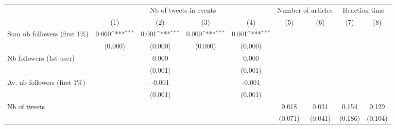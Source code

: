 {
\def\sym#1{\ifmmode^{#1}\else\(^{#1}\)\fi}
\begin{tabular}{l*{8}{c}}
\hline\hline
                    &\multicolumn{4}{c}{Nb of tweets in events}                                             &\multicolumn{2}{c}{Number of articles}     &\multicolumn{2}{c}{Reaction time}          \\\cmidrule(lr){2-5}\cmidrule(lr){6-7}\cmidrule(lr){8-9}
                    &\multicolumn{1}{c}{(1)}         &\multicolumn{1}{c}{(2)}         &\multicolumn{1}{c}{(3)}         &\multicolumn{1}{c}{(4)}         &\multicolumn{1}{c}{(5)}         &\multicolumn{1}{c}{(6)}         &\multicolumn{1}{c}{(7)}         &\multicolumn{1}{c}{(8)}         \\
\hline
Sum nb followers (first 1$\%$)&       0.000\sym{***}&       0.001\sym{***}&       0.000\sym{***}&       0.001\sym{***}&                     &                     &                     &                     \\
                    &     (0.000)         &     (0.000)         &     (0.000)         &     (0.000)         &                     &                     &                     &                     \\
Nb followers (1st user)&                     &       0.000         &                     &       0.000         &                     &                     &                     &                     \\
                    &                     &     (0.001)         &                     &     (0.001)         &                     &                     &                     &                     \\
Av. nb followers (first 1$\%$)&                     &      -0.001         &                     &      -0.001         &                     &                     &                     &                     \\
                    &                     &     (0.001)         &                     &     (0.001)         &                     &                     &                     &                     \\
Nb of tweets        &                     &                     &                     &                     &       0.018         &       0.031         &       0.154         &       0.129         \\
                    &                     &                     &                     &                     &     (0.071)         &     (0.041)         &     (0.186)         &     (0.104)         \\

\end{tabular}}
